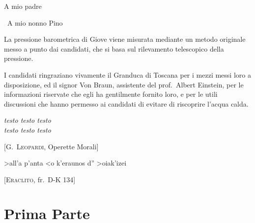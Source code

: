 \documentclass[%
    corpo=13pt,
    twoside,
    oldstyle,
    autoretitolo,
    greek,
    evenboxes,
    nocenterfolio,
    nocenterhead,
]{toptesi}
\begin{document}
%
{\tomo
  \paginavuota
    \begin{dedica}
        A mio padre

        \textdagger\ A mio nonno Pino
    \end{dedica}
}{%
    \frontespizio %
}

\sommario

La pressione barometrica di Giove viene misurata
mediante un metodo originale  messo a punto dai candidati, che si basa
sul rilevamento telescopico della pressione.


\ringraziamenti

I candidati ringraziano vivamente il Granduca di Toscana per i mezzi
messi loro a disposizione, ed il signor Von Braun, assistente del
prof.~Albert Einstein, per le informazioni riservate che egli ha
gentilmente fornito loro, e per le utili discussioni che hanno permesso
ai candidati di evitare di riscoprire l'acqua calda.

\tablespagetrue\figurespagetrue %
\indici

\ifclassica   
\begin{citazioni}
        \textit{testo testo testo\\testo testo testo}

        [\textsc{G.\ Leopardi}, Operette Morali]\vspace{1em}

        \textgreek{>all'a p'anta <o k'eraunos d'' >oiak'izei}

        [\textsc{Eraclito}, fr.\ D-K 134]
    \end{citazioni}

\fi


\part{Prima Parte}
\end{document}
